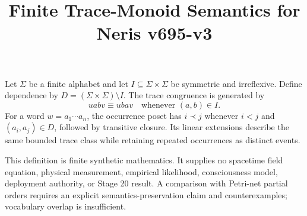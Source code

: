 \documentclass{article}
\title{Finite Trace-Monoid Semantics for Neris v695-v3}
\begin{document}
\maketitle
Let $\Sigma$ be a finite alphabet and let $I\subseteq\Sigma\times\Sigma$ be symmetric and irreflexive. Define dependence by $D=(\Sigma\times\Sigma)\setminus I$. The trace congruence is generated by
\[
uabv \equiv ubav \quad\text{whenever }(a,b)\in I.
\]
For a word $w=a_1\cdots a_n$, the occurrence poset has $i\prec j$ whenever $i<j$ and $(a_i,a_j)\in D$, followed by transitive closure. Its linear extensions describe the same bounded trace class while retaining repeated occurrences as distinct events.

This definition is finite synthetic mathematics. It supplies no spacetime field equation, physical measurement, empirical likelihood, consciousness model, deployment authority, or Stage 20 result. A comparison with Petri-net partial orders requires an explicit semantics-preservation claim and counterexamples; vocabulary overlap is insufficient.
\end{document}
